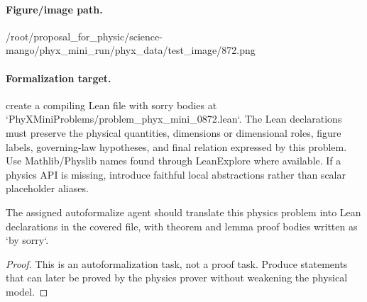 \paragraph{Figure/image path.}
/root/proposal\_for\_physic/science-mango/phyx\_mini\_run/phyx\_data/test\_image/872.png

\paragraph{Formalization target.}
create a compiling Lean file with sorry bodies at `PhyXMiniProblems/problem\_phyx\_mini\_0872.lean`. The Lean declarations must preserve the physical quantities, dimensions or dimensional roles, figure labels, governing-law hypotheses, and final relation expressed by this problem.
Use Mathlib/Physlib names found through LeanExplore where available. If a physics API is missing, introduce faithful local abstractions rather than scalar placeholder aliases.

\begin{theorem}
\label{thm:physics:phyx_mini_0872:target}
The assigned autoformalize agent should translate this physics problem into Lean declarations in the covered file, with theorem and lemma proof bodies written as `by sorry`.
\end{theorem}
\begin{proof}
This is an autoformalization task, not a proof task. Produce statements that can later be proved by the physics prover without weakening the physical model.
\end{proof}

